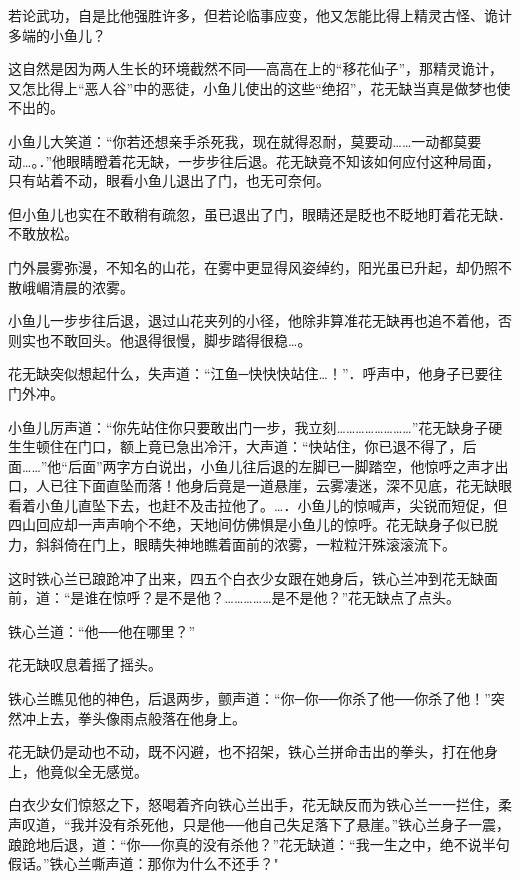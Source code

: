 \documentclass[12pt,oneside]{book}
\begin{document}
若论武功，自是比他强胜许多，但若论临事应变，他又怎能比得上精灵古怪、诡计多端的小鱼儿？

这自然是因为两人生长的环境截然不同──高高在上的``移花仙子''，那精灵诡计，又怎比得上``恶人谷''中的恶徒，小鱼儿使出的这些``绝招''，花无缺当真是做梦也使不出的。

小鱼儿大笑道：``你若还想亲手杀死我，现在就得忍耐，莫要动\ldots\ldots 一动都莫要动\ldots。．''他眼睛瞪着花无缺，一步步往后退。花无缺竟不知该如何应付这种局面，只有站着不动，眼看小鱼儿退出了门，也无可奈何。

但小鱼儿也实在不敢稍有疏忽，虽已退出了门，眼睛还是眨也不眨地盯着花无缺．不敢放松。

门外晨雾弥漫，不知名的山花，在雾中更显得风姿绰约，阳光虽已升起，却仍照不散峨嵋清晨的浓雾。

小鱼儿一步步往后退，退过山花夹列的小径，他除非算准花无缺再也追不着他，否则实也不敢回头。他退得很慢，脚步踏得很稳\ldots。

花无缺突似想起什么，失声道：``江鱼─快快快站住\ldots！''．呼声中，他身子已要往门外冲。

小鱼儿厉声道：``你先站住你只要敢出门一步，我立刻\ldots\ldots\ldots\ldots\ldots\ldots\ldots\ldots{}''花无缺身子硬生生顿住在门口，额上竟已急出冷汗，大声道：``快站住，你已退不得了，后面\ldots\ldots{}''他``后面''两字方白说出，小鱼儿往后退的左脚已一脚踏空，他惊呼之声才出口，人已往下面直坠而落！他身后竟是一道悬崖，云雾凄迷，深不见底，花无缺眼看着小鱼儿直坠下去，也赶不及击拉他了。\ldots．小鱼儿的惊喊声，尖锐而短促，但四山回应却一声声响个不绝，天地间仿佛惧是小鱼儿的惊呼。花无缺身子似已脱力，斜斜倚在门上，眼睛失神地瞧着面前的浓雾，一粒粒汗殊滚滚流下。

这时铁心兰已踉跄冲了出来，四五个白衣少女跟在她身后，铁心兰冲到花无缺面前，道：``是谁在惊呼？是不是他？\ldots\ldots\ldots\ldots\ldots 是不是他？''花无缺点了点头。

铁心兰道：``他──他在哪里？''

花无缺叹息着摇了摇头。

铁心兰瞧见他的神色，后退两步，颤声道：``你─你──你杀了他──你杀了他！''突然冲上去，拳头像雨点般落在他身上。

花无缺仍是动也不动，既不闪避，也不招架，铁心兰拼命击出的拳头，打在他身上，他竟似全无感觉。

白衣少女们惊怒之下，怒喝着齐向铁心兰出手，花无缺反而为铁心兰一一拦住，柔声叹道，``我并没有杀死他，只是他──他自己失足落下了悬崖。''铁心兰身子一震，踉跄地后退，道：``你──你真的没有杀他？''花无缺道：``我一生之中，绝不说半句假话。''铁心兰嘶声道：那你为什么不还手？"
\end{document}
